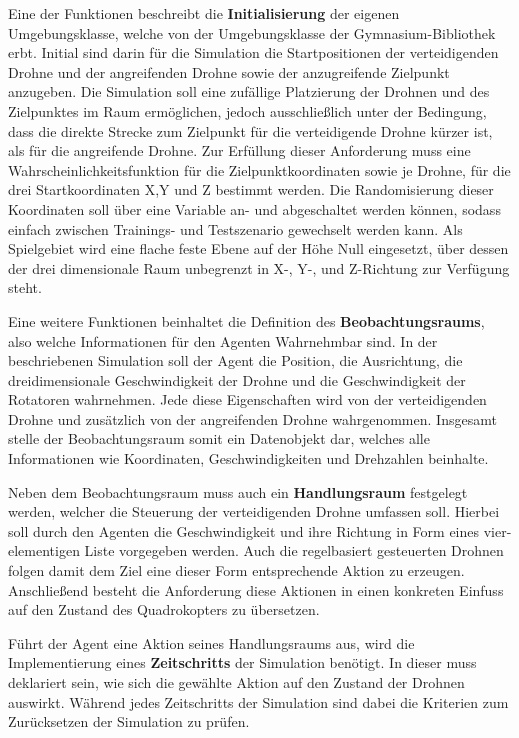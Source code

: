 Eine der Funktionen beschreibt die \textbf{Initialisierung} der eigenen Umgebungsklasse, welche von der Umgebungsklasse der Gymnasium-Bibliothek erbt.
Initial sind darin für die Simulation die Startpositionen der verteidigenden Drohne und der angreifenden Drohne sowie der anzugreifende Zielpunkt anzugeben.
Die Simulation soll eine zufällige Platzierung der Drohnen und des Zielpunktes im Raum ermöglichen, jedoch ausschließlich unter der Bedingung, dass die direkte Strecke zum Zielpunkt für die verteidigende Drohne kürzer ist, als für die angreifende Drohne.
Zur Erfüllung dieser Anforderung muss eine Wahrscheinlichkeitsfunktion für die Zielpunktkoordinaten sowie je Drohne, für die drei Startkoordinaten X,Y und Z bestimmt werden.
Die Randomisierung dieser Koordinaten soll über eine Variable an- und abgeschaltet werden können, sodass einfach zwischen Trainings- und Testszenario gewechselt werden kann.
Als Spielgebiet wird eine flache feste Ebene auf der Höhe Null eingesetzt, über dessen der drei dimensionale Raum unbegrenzt in X-, Y-, und Z-Richtung zur Verfügung steht.

Eine weitere Funktionen beinhaltet die Definition des \textbf{Beobachtungsraums}, also welche Informationen für den Agenten Wahrnehmbar sind. 
In der beschriebenen Simulation soll der Agent die Position, die Ausrichtung, die dreidimensionale Geschwindigkeit der Drohne und die Geschwindigkeit der Rotatoren wahrnehmen. 
Jede diese Eigenschaften wird von der verteidigenden Drohne und zusätzlich von der angreifenden Drohne wahrgenommen. 
Insgesamt stelle der Beobachtungsraum somit ein Datenobjekt dar, welches alle Informationen wie Koordinaten, Geschwindigkeiten und Drehzahlen beinhalte.

Neben dem Beobachtungsraum muss auch ein \textbf{Handlungsraum} festgelegt werden, welcher die Steuerung der verteidigenden Drohne umfassen soll.
Hierbei soll durch den Agenten die Geschwindigkeit und ihre Richtung in Form eines vier-elementigen Liste vorgegeben werden.
Auch die regelbasiert gesteuerten Drohnen folgen damit dem Ziel eine dieser Form entsprechende Aktion zu erzeugen.
Anschließend besteht die Anforderung diese Aktionen in einen konkreten Einfuss auf den Zustand des Quadrokopters zu übersetzen.

Führt der Agent eine Aktion seines Handlungsraums aus, wird die Implementierung eines \textbf{Zeitschritts} der Simulation benötigt.
In dieser muss deklariert sein, wie sich die gewählte Aktion auf den Zustand der Drohnen auswirkt.
Während jedes Zeitschritts der Simulation sind dabei die Kriterien zum Zurücksetzen der Simulation zu prüfen.

